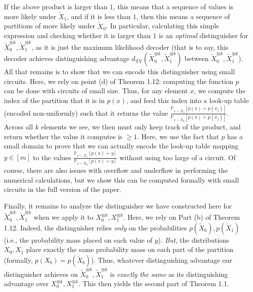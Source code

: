 \documentclass[10pt,a4paper]{article}
\begin{document}
If the above product is larger than $1$, this means that a sequence of values is more likely under $\widetilde{X}_{1}$, and if it is less than $1$, then this means a sequence of partitions of more likely under $\widetilde{X}_{0}$. In particular, calculating this simple expression and checking whether it is larger than $1$ is an \emph{optimal} distinguisher for $\widetilde{X}^{\otimes k}_{0},\widetilde{X}^{\otimes k}_{1}$, as it is just the maximum likelihood decoder (that is to say, this decoder achieves distinguishing advantage $d_{\mathrm{TV}}(\widetilde{X}_{0}^{\otimes k},\widetilde{X}_{1}^{\otimes k})$ between $\widetilde{X}^{\otimes k}_{0},\widetilde{X}^{\otimes k}_{1}$). All that remains is to show that we can encode this distinguisher using small circuits. Here, we rely on point (d) of Theorem 1.12: computing the function $p$ can be done with circuits of small size. Thus, for any element $x$, we compute the index of the partition that it is in $p(x)$, and feed this index into a look-up table (encoded non-uniformly) such that it returns the value $\frac{\mathbb{P}_{x\sim\widetilde{X}_{1}}[p(x)=p(x_{j})]}{\mathbb{P}_{x\sim\widetilde{X}_{0}}[p(x)=p(x_{j})]}$. Across all $k$ elements we see, we then must only keep track of the product, and return whether the value it computes is $\geq 1$. Here, we use the fact that $p$ has a small domain to prove that we can actually encode the look-up table mapping $y\in[m]$ to the values $\frac{\mathbb{P}_{x\sim\widetilde{X}_{1}}[p(x)=y]}{\mathbb{P}_{x\sim\widetilde{X}_{0}}[p(x)=y]}$ without using too large of a circuit. Of course, there are also issues with overflow and underflow in performing the numerical calculations, but we show this can be computed formally with small circuits in the full version of the paper.\par




Finally, it remains to analyze the distinguisher we have constructed here for $\widetilde{X}^{\otimes k}_{0},\widetilde{X}^{\otimes k}_{1}$ when we apply it to $X_{0}^{\otimes k},X_{1}^{\otimes k}$. Here, we rely on Part (b) of Theorem 1.12. Indeed, the distinguisher relies \emph{only} on the probabilities $p(\widetilde{X}_{0}),p(\widetilde{X}_{1})$ (i.e., the probability mass placed on each value of $y$). \emph{But}, the distributions $X_{0},X_{1}$ place exactly the same probability mass on each part of the partition (formally, $p(X_{b})=p(\widetilde{X}_{b})$). Thus, whatever distinguishing advantage our distinguisher achieves on $\widetilde{X}^{\otimes k}_{0},\widetilde{X}^{\otimes k}_{1}$ is \emph{exactly the same} as its distinguishing advantage over $X_{0}^{\otimes k},X_{1}^{\otimes k}$. This then yields the second part of Theorem 1.1.\par
\end{document}
